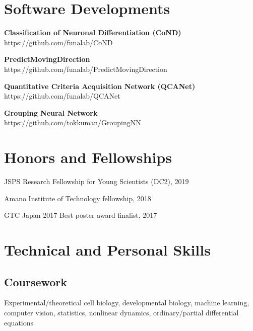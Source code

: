 \documentclass[letterpaper]{article}
\renewenvironment{itemize}{
  \begin{list}{}{
    \setlength{\leftmargin}{1.5em}
  }
}{
  \end{list}
}
\begin{document}
\section*{\bf Software Developments}
\vspace{-0.6cm}
\hrulefill

\begin{itemize}
 \item {\bf Classification of Neuronal Differentiation (CoND)} \\
       https://github.com/funalab/CoND
 \item {\bf PredictMovingDirection} \\
       https://github.com/funalab/PredictMovingDirection
 \item {\bf Quantitative Criteria Acquisition Network (QCANet)} \\
       https://github.com/funalab/QCANet
 \item {\bf Grouping Neural Network} \\
       https://github.com/tokkuman/GroupingNN
       \\
\end{itemize}


\section*{\bf Honors and Fellowships}
\vspace{-0.6cm}
\hrulefill

\begin{itemize}
 \item JSPS Research Fellowship for Young Scientists (DC2), 2019
 \item Amano Institute of Technology fellowship, 2018
 \item GTC Japan 2017 Best poster award finalist, 2017
       \\
\end{itemize}


\section*{\bf Technical and Personal Skills}
\vspace{-0.6cm}
\hrulefill
\vspace{-0.3cm}

\subsection*{\bf Coursework}
Experimental/theoretical cell biology, developmental biology, machine
learning, computer vision, statistics, nonlinear dynamics,
ordinary/partial differential equations
\end{document}
